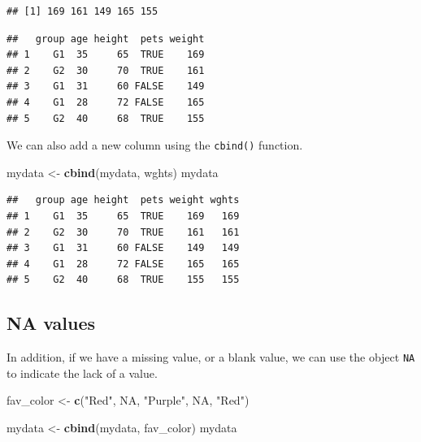 \documentclass[
]{book}
\newenvironment{Shaded}{\begin{snugshade}}{\end{snugshade}}
\newcommand{\KeywordTok}[1]{\textcolor[rgb]{0.13,0.29,0.53}{\textbf{#1}}}
\newcommand{\NormalTok}[1]{#1}
\newcommand{\OperatorTok}[1]{\textcolor[rgb]{0.81,0.36,0.00}{\textbf{#1}}}
\newcommand{\OtherTok}[1]{\textcolor[rgb]{0.56,0.35,0.01}{#1}}
\newcommand{\StringTok}[1]{\textcolor[rgb]{0.31,0.60,0.02}{#1}}
\begin{document}
\begin{verbatim}
## [1] 169 161 149 165 155
\end{verbatim}

\begin{Shaded}
\end{Shaded}

\begin{verbatim}
##   group age height  pets weight
## 1    G1  35     65  TRUE    169
## 2    G2  30     70  TRUE    161
## 3    G1  31     60 FALSE    149
## 4    G1  28     72 FALSE    165
## 5    G2  40     68  TRUE    155
\end{verbatim}

We can also add a new column using the \texttt{cbind()} function.

\begin{Shaded}
\begin{Highlighting}[]
\NormalTok{mydata <-}\StringTok{ }\KeywordTok{cbind}\NormalTok{(mydata, wghts)}
\NormalTok{mydata}
\end{Highlighting}
\end{Shaded}

\begin{verbatim}
##   group age height  pets weight wghts
## 1    G1  35     65  TRUE    169   169
## 2    G2  30     70  TRUE    161   161
## 3    G1  31     60 FALSE    149   149
## 4    G1  28     72 FALSE    165   165
## 5    G2  40     68  TRUE    155   155
\end{verbatim}

\hypertarget{na-values}{%
\subsection*{NA values}\label{na-values}}

In addition, if we have a missing value, or a blank value, we can use the object \texttt{NA} to indicate the lack of a value.

\begin{Shaded}
\begin{Highlighting}[]
\NormalTok{fav_color <-}\StringTok{ }\KeywordTok{c}\NormalTok{(}\StringTok{"Red"}\NormalTok{, }\OtherTok{NA}\NormalTok{, }\StringTok{"Purple"}\NormalTok{, }\OtherTok{NA}\NormalTok{, }\StringTok{"Red"}\NormalTok{)}

\NormalTok{mydata <-}\StringTok{ }\KeywordTok{cbind}\NormalTok{(mydata, fav_color)}
\NormalTok{mydata}
\end{Highlighting}
\end{Shaded}
\end{document}
